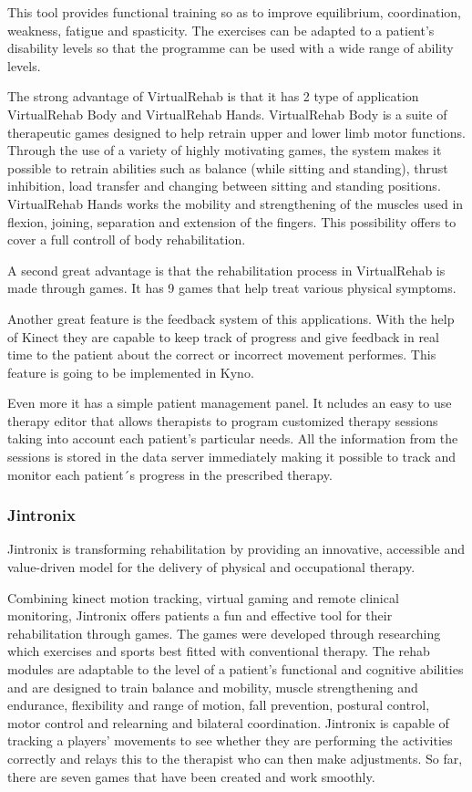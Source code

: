 This tool provides functional training so as to improve equilibrium, coordination, weakness, fatigue and spasticity. The exercises can be adapted to a patient’s disability levels so that the programme can be used with a wide range of ability levels.

The strong advantage of VirtualRehab is that it has 2 type of application VirtualRehab Body and VirtualRehab Hands. 
VirtualRehab Body is a suite of therapeutic
games designed to help retrain upper and lower
limb motor functions.
Through the use of a variety of highly motivating
games, the system makes it possible to retrain
abilities such as balance (while sitting and
standing), thrust inhibition, load transfer
and changing between sitting and standing
positions. VirtualRehab Hands works the mobility and
strengthening of the muscles used in flexion,
joining, separation and extension of the fingers. This possibility offers to cover a full controll of body rehabilitation.

A second great advantage is that the rehabilitation process in VirtualRehab is made through games. It has 9 games that help treat various physical symptoms.

Another great feature is the feedback system of this applications. With the help of Kinect they are capable to keep track of progress and give feedback in real time to the patient about the correct or incorrect movement performes. This feature is going to be implemented in Kyno.

Even more it has a simple patient management panel. It ncludes an easy to use therapy editor that allows therapists to program customized therapy sessions taking into account each patient’s particular needs.  All the information from the sessions is stored in the data server immediately making it possible to track and monitor each patient´s progress in the prescribed therapy.
\subsubsection{Jintronix}
Jintronix is transforming rehabilitation by providing an innovative, accessible and value-driven model for the delivery of physical and occupational therapy. 

Combining kinect motion tracking, virtual gaming and remote clinical monitoring, Jintronix offers patients a fun and effective tool for their rehabilitation through games. 
The games were developed through researching which exercises and sports best fitted with conventional therapy. The rehab modules are adaptable to the level of a patient's functional and cognitive abilities and are designed to train balance and mobility, muscle strengthening and endurance, flexibility and range of motion, fall prevention, postural control, motor control and relearning and bilateral coordination. Jintronix is capable of tracking a players’ movements to see whether they are performing the activities correctly and relays this to the therapist who can then make adjustments. So far, there are seven games that have been created and work smoothly.

